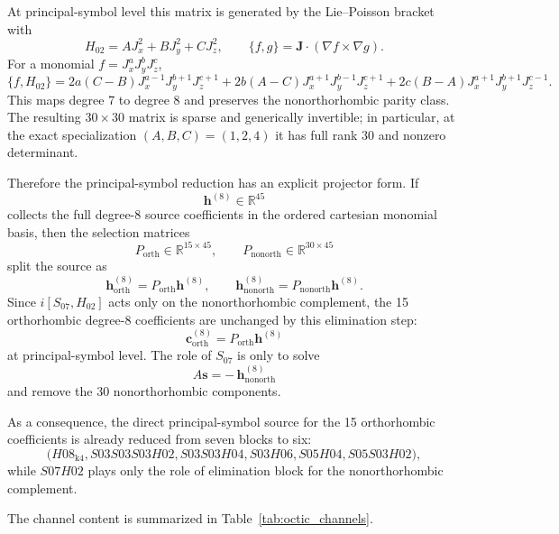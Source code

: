 \documentclass[aip,jcp,reprint,floatfix]{revtex4-2}
\begin{document}
At principal-symbol level this matrix is generated by the Lie--Poisson bracket
with
\[
H_{02}=A J_x^2 + B J_y^2 + C J_z^2,
\qquad
\{f,g\}= \mathbf J\cdot(\nabla f \times \nabla g).
\]
For a monomial \(f=J_x^aJ_y^bJ_z^c\),
\[
\{f,H_{02}\}
=
2a(C-B)J_x^{a-1}J_y^{b+1}J_z^{c+1}
+2b(A-C)J_x^{a+1}J_y^{b-1}J_z^{c+1}
+2c(B-A)J_x^{a+1}J_y^{b+1}J_z^{c-1}.
\]
This maps degree 7 to degree 8 and preserves the nonorthorhombic parity
class. The resulting \(30\times 30\) matrix is sparse and generically
invertible; in particular, at the exact specialization \((A,B,C)=(1,2,4)\) it
has full rank 30 and nonzero determinant.

Therefore the principal-symbol reduction has an explicit projector form. If
\[
\mathbf h^{(8)}\in\mathbb R^{45}
\]
collects the full degree-8 source coefficients in the ordered cartesian
monomial basis, then the selection matrices
\[
P_{\mathrm{orth}}\in\mathbb R^{15\times 45},
\qquad
P_{\mathrm{nonorth}}\in\mathbb R^{30\times 45}
\]
split the source as
\[
\mathbf h_{\mathrm{orth}}^{(8)}=P_{\mathrm{orth}}\mathbf h^{(8)},
\qquad
\mathbf h_{\mathrm{nonorth}}^{(8)}=P_{\mathrm{nonorth}}\mathbf h^{(8)}.
\]
Since \(i[S_{07},H_{02}]\) acts only on the nonorthorhombic complement, the
15 orthorhombic degree-8 coefficients are unchanged by this elimination step:
\[
\mathbf c_{\mathrm{orth}}^{(8)} = P_{\mathrm{orth}}\mathbf h^{(8)}
\]
at principal-symbol level. The role of \(S_{07}\) is only to solve
\[
A\mathbf s = -\,\mathbf h_{\mathrm{nonorth}}^{(8)}
\]
and remove the 30 nonorthorhombic components.

As a consequence, the direct principal-symbol source for the 15 orthorhombic
coefficients is already reduced from seven blocks to six:
\[
\bigl(
H08_{\mathrm{k4}},
S03S03S03H02,
S03S03H04,
S03H06,
S05H04,
S05S03H02
\bigr),
\]
while \(S07H02\) plays only the role of elimination block for the
nonorthorhombic complement.

The channel content is summarized in Table~\ref{tab:octic_channels}.
\end{document}
